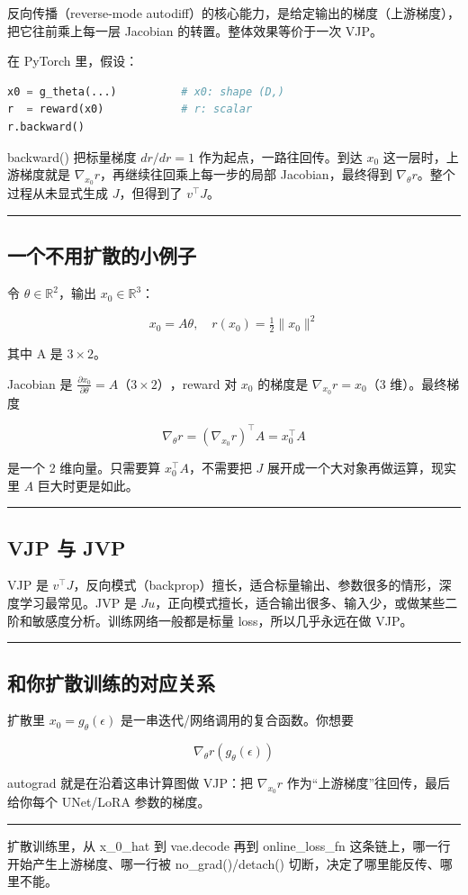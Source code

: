 反向传播（reverse-mode autodiff）的核心能力，是给定输出的梯度（上游梯度），把它往前乘上每一层 Jacobian 的转置。整体效果等价于一次 VJP。

在 PyTorch 里，假设：

\begin{lstlisting}[language=python]
x0 = g_theta(...)          # x0: shape (D,)
r  = reward(x0)            # r: scalar
r.backward()
\end{lstlisting}

backward() 把标量梯度 \(dr/dr=1\) 作为起点，一路往回传。到达 \(x_0\) 这一层时，上游梯度就是 \(\nabla_{x_0} r\)，再继续往回乘上每一步的局部 Jacobian，最终得到 \(\nabla_\theta r\)。整个过程从未显式生成 \(J\)，但得到了 \(v^\top J\)。

\hrule

\subsection{一个不用扩散的小例子}

令 \(\theta\in\mathbb{R}^2\)，输出 \(x_0\in\mathbb{R}^3\)：

\[
x_0 = A\theta,\quad r(x_0)=\tfrac12\|x_0\|^2
\]

其中 A 是 \(3\times2\)。

Jacobian 是 \(\frac{\partial x_0}{\partial\theta}=A（3×2）\)，reward 对 \(x_0\) 的梯度是 \(\nabla_{x_0} r = x_0\)（3 维）。最终梯度

\[
\nabla_\theta r = (\nabla_{x_0} r)^\top A = x_0^\top A
\]

是一个 2 维向量。只需要算 \(x_0^\top A\)，不需要把 \(J\) 展开成一个大对象再做运算，现实里 \(A\) 巨大时更是如此。

\hrule

\subsection{VJP 与 JVP}

VJP 是 \(v^\top J\)，反向模式（backprop）擅长，适合标量输出、参数很多的情形，深度学习最常见。JVP 是 \(J u\)，正向模式擅长，适合输出很多、输入少，或做某些二阶和敏感度分析。训练网络一般都是标量 loss，所以几乎永远在做 VJP。

\hrule

\subsection{和你扩散训练的对应关系}

扩散里 \(x_0=g_\theta(\epsilon)\) 是一串迭代/网络调用的复合函数。你想要

\[
\nabla_\theta r(g_\theta(\epsilon))
\]

autograd 就是在沿着这串计算图做 VJP：把 \(\nabla_{x_0} r\) 作为“上游梯度”往回传，最后给你每个 UNet/LoRA 参数的梯度。

\hrule

扩散训练里，从 x\_0\_hat 到 vae.decode 再到 online\_loss\_fn 这条链上，哪一行开始产生上游梯度、哪一行被 no\_grad()/detach() 切断，决定了哪里能反传、哪里不能。
